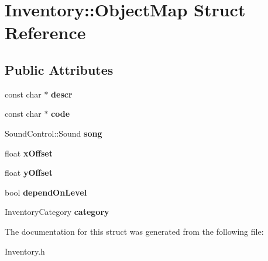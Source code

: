 \hypertarget{structInventory_1_1ObjectMap}{\section{\-Inventory\-:\-:\-Object\-Map \-Struct \-Reference}
\label{structInventory_1_1ObjectMap}
}
\subsection*{\-Public \-Attributes}
\begin{DoxyCompactItemize}
\item 
\hypertarget{structInventory_1_1ObjectMap_ada02bed6b7729e7fbd7981b3bb5cc341}{const char $\ast$ {\bfseries descr}}\label{structInventory_1_1ObjectMap_ada02bed6b7729e7fbd7981b3bb5cc341}

\item 
\hypertarget{structInventory_1_1ObjectMap_af7ee9d2417589882df0421b68d3a577c}{const char $\ast$ {\bfseries code}}\label{structInventory_1_1ObjectMap_af7ee9d2417589882df0421b68d3a577c}

\item 
\hypertarget{structInventory_1_1ObjectMap_a6641e52f2a3552b9006c8a7338d9957a}{\-Sound\-Control\-::\-Sound {\bfseries song}}\label{structInventory_1_1ObjectMap_a6641e52f2a3552b9006c8a7338d9957a}

\item 
\hypertarget{structInventory_1_1ObjectMap_a505aecaea9c664fbe025ad9504151913}{float {\bfseries x\-Offset}}\label{structInventory_1_1ObjectMap_a505aecaea9c664fbe025ad9504151913}

\item 
\hypertarget{structInventory_1_1ObjectMap_ab3d1634e4a88c82474681aa624f50cab}{float {\bfseries y\-Offset}}\label{structInventory_1_1ObjectMap_ab3d1634e4a88c82474681aa624f50cab}

\item 
\hypertarget{structInventory_1_1ObjectMap_a945bc8d8cdcbc4dba9c45ea195504c2a}{bool {\bfseries depend\-On\-Level}}\label{structInventory_1_1ObjectMap_a945bc8d8cdcbc4dba9c45ea195504c2a}

\item 
\hypertarget{structInventory_1_1ObjectMap_aece3298428d71891db0060023100d35e}{\-Inventory\-Category {\bfseries category}}\label{structInventory_1_1ObjectMap_aece3298428d71891db0060023100d35e}

\end{DoxyCompactItemize}


\-The documentation for this struct was generated from the following file\-:\begin{DoxyCompactItemize}
\item 
\-Inventory.\-h\end{DoxyCompactItemize}
